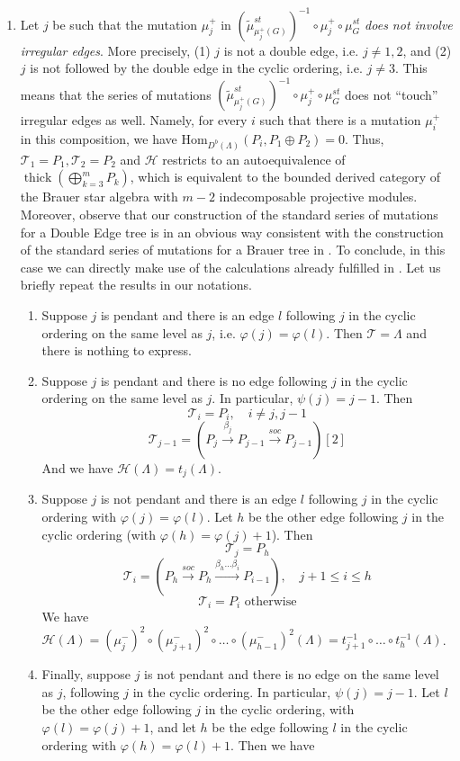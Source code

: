 \documentclass[12pt]{amsart}
\theoremstyle{plain}
\theoremstyle{remark}
\theoremstyle{definition}
\newcommand{\Hom}{{\mathrm{Hom}}}
\newcommand{\thick}{\mathop{\mathrm{thick}}\nolimits}
\begin{document}
\begin{enumerate}
\item Let $j$ be such that the mutation $\mu_j^+$ in $(\widetilde{\mu}_{\mu_j^+(G)}^{st})^{-1} \circ \mu_j^+ \circ \mu_G^{st}$ {\it does not involve irregular edges}. More precisely, (1) $j$ is not a double edge, i.e. $j \neq 1, 2$, and (2) $j$ is not followed by the double edge in the cyclic ordering, i.e. $j \neq 3$. This means that the series of mutations $(\widetilde{\mu}_{\mu_j^+(G)}^{st})^{-1} \circ \mu_j^+ \circ \mu_G^{st}$ does not ``touch'' irregular edges as well. Namely, for every $i$ such that there is a mutation $\mu_i^+$ in this composition, we have $\Hom_{D^b(\Lambda)}(P_i, P_1 \oplus P_2) = 0$. Thus, ${\mathcal{T}_1 = P_1, \mathcal{T}_2 = P_2}$ and $\mathcal{H}$ restricts to an autoequivalence of $\thick(\bigoplus_{k=3}^m P_k)$, which is equivalent to the bounded derived category of the Brauer star algebra with $m-2$ indecomposable projective modules. Moreover, observe that our construction of the standard series of mutations for a Double Edge tree is in an obvious way consistent with the construction of the standard series of mutations for a Brauer tree in \cite{Alexandra}. To conclude, in this case we can directly make use of the calculations already fulfilled in \cite{Alexandra}. Let us briefly repeat the results in our notations. 
\begin{enumerate}
    \item Suppose $j$ is pendant and there is an edge $l$ following $j$ in the cyclic ordering on the same level as $j$, i.e. $\varphi(j) = \varphi(l)$. Then $\mathcal{T} = \Lambda$ and there is nothing to express. 
    \item Suppose $j$ is pendant and there is no edge following $j$ in the cyclic ordering on the same level as $j$. In particular, $\psi(j) = j-1$. Then 
    $$\mathcal{T}_i = P_i, \quad i \neq j,j-1 $$ 
    $$\mathcal{T}_{j-1} = (P_j \xrightarrow{\beta_j} P_{j-1} \xrightarrow{soc} P_{j-1})[2]$$ 
    And we have $\mathcal{H}(\Lambda) = t_j(\Lambda)$. 
    \item Suppose $j$ is not pendant and there is an edge $l$ following $j$ in the cyclic ordering with $\varphi(j) = \varphi(l)$. Let $h$ be the other edge following $j$ in the cyclic ordering (with $\varphi(h) = \varphi(j)+1$). Then
    $$ \mathcal{T}_j = P_h$$
    $$\mathcal{T}_i = (P_h \xrightarrow{soc} P_h \xrightarrow{\beta_h \dots \beta_i} P_{i-1}), \quad j+1 \leq i \leq h$$   
    $$ \mathcal{T}_i = P_i \text{ otherwise}$$
   We have $\mathcal{H}(\Lambda) = (\mu_j^-)^2 \circ (\mu_{j+1}^-)^2 \circ \dots \circ (\mu_{h-1}^-)^2(\Lambda) = t_{j+1}^{-1} \circ \dots \circ t_h^{-1}(\Lambda)$. 
    \item Finally, suppose $j$ is not pendant and there is no edge on the same level as $j$, following $j$ in the cyclic ordering. In particular, $\psi(j) = j-1$. Let $l$ be the other edge following $j$ in the cyclic ordering, with $\varphi(l) = \varphi(j) +1$, and let $h$ be the edge following $l$ in the cyclic ordering with $\varphi(h) = \varphi(l)+1$. Then we have 
    

\end{enumerate}
\end{enumerate}
\end{document}
